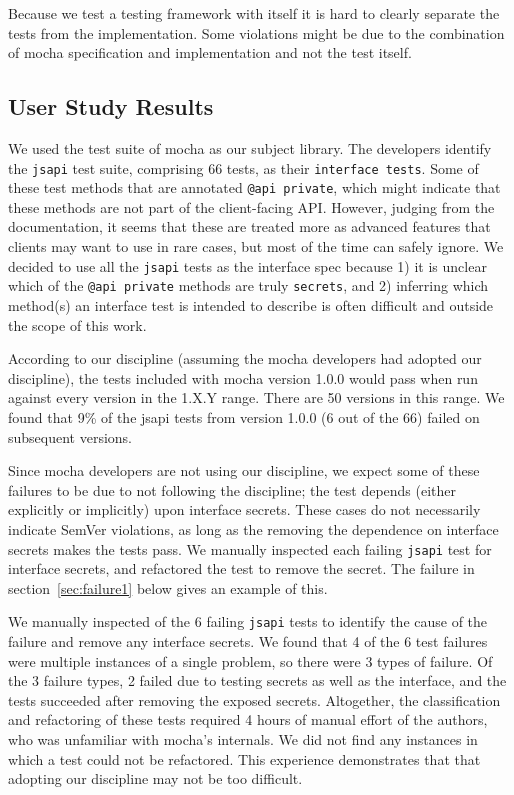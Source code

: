 Because we test a testing framework with itself it is hard to clearly
separate the tests from the implementation. Some violations might be 
due to the combination of mocha specification and implementation and not
the test itself.

\subsection{User Study Results}
We used the test suite of mocha as our subject library. The developers
identify the {\tt jsapi} test suite, comprising 66 tests, as their
{\tt interface tests}. Some of these test methods that are annotated
{\tt @api private}, which might indicate that these methods are not
part of the client-facing API\@. However, judging from the
documentation, it seems that these are treated more as advanced
features that clients may want to use in rare cases, but most of the
time can safely ignore. We decided to use all the {\tt jsapi} tests as the
interface spec because 1) it is unclear which of the {\tt @api
  private} methods are truly {\tt secrets}, and 2) inferring which
method(s) an interface test is intended to describe is often difficult and
outside the scope of this work.

According to our discipline (assuming the mocha developers had adopted
our discipline), the tests included with mocha version 1.0.0 would
pass when run against every version in the 1.X.Y range. There are 50
versions in this range. We found that 9\% of the jsapi tests from
version 1.0.0 (6 out of the 66) failed on subsequent versions.

Since mocha developers are not using our discipline, we expect some of
these failures to be due to not following the discipline; the test
depends (either explicitly or implicitly) upon interface secrets. These
cases do not necessarily indicate SemVer violations, as long as the
removing the dependence on interface secrets makes the tests pass. We
manually inspected each failing {\tt jsapi} test for interface secrets, and
refactored the test to remove the secret. The failure in
section~\ref{sec:failure1} below gives an example of this.

We manually inspected of the 6 failing {\tt jsapi} tests to identify the
cause of the failure and remove any interface secrets. We found that 4 of
the 6 test failures were multiple instances of a single problem, so
there were 3 types of failure. Of the 3 failure types, 2 failed due to
testing secrets as well as the interface, and the tests succeeded after
removing the exposed secrets. Altogether, the classification and
refactoring of these tests required 4 hours of manual effort of the
authors, who was unfamiliar with mocha's internals. We did not find any
instances in which a test could not be refactored. This experience
demonstrates that that adopting our discipline may not be too difficult.

